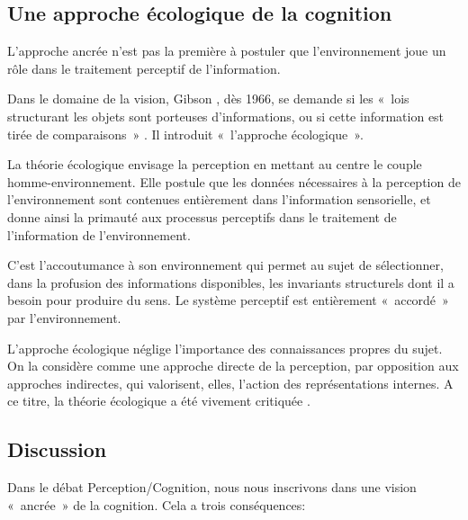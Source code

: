 \subsection{Une approche écologique de la cognition}
\label{sec:ch3_ecologiqueCognition}

L'approche ancrée n'est pas la première à postuler que l'environnement joue un rôle dans le traitement perceptif de l'information.

Dans le domaine de la vision, Gibson \citep{gibson1966senses}, dès 1966, se demande si les «~lois structurant les objets sont porteuses d'informations, ou si cette information est tirée de comparaisons~» \citep{gibson1978ecological}. Il introduit «~l'approche écologique~». 

La théorie écologique envisage la perception en mettant au centre le couple homme-environnement. Elle postule que les données nécessaires à la perception de l'environnement sont contenues entièrement dans l'information sensorielle, et donne ainsi la primauté aux processus perceptifs dans le traitement de l'information de l'environnement.

C'est l'accoutumance à son environnement qui permet au sujet de sélectionner, dans la profusion des informations disponibles, les invariants structurels dont il a besoin pour produire du sens. Le système perceptif est entièrement «~accordé~» par l'environnement.

L'approche écologique néglige l'importance des connaissances propres du sujet. On la considère comme une approche directe de la perception, par opposition aux approches indirectes, qui valorisent, elles, l'action des représentations internes. A ce titre, la théorie écologique a été vivement critiquée \citep{ullman1980against}.

\subsection{Discussion} 

\label{sec:ch3_groundedCogDiscussion}

Dans le débat Perception/Cognition, nous nous inscrivons dans une vision «~ancrée~» de la cognition. Cela a trois conséquences:

